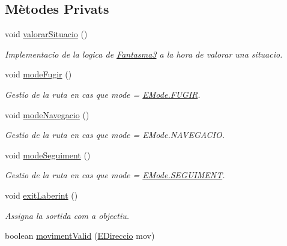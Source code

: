 \subsection*{Mètodes Privats}
\begin{DoxyCompactItemize}
\item 
void \hyperlink{classlogica_1_1_fantasma3_a69e326a7ea8fd47d3d8e4e3f8fd70412}{valorar\+Situacio} ()
\begin{DoxyCompactList}\small\item\em Implementacio de la logica de \hyperlink{classlogica_1_1_fantasma3}{Fantasma3} a la hora de valorar una situacio. \end{DoxyCompactList}\item 
void \hyperlink{classlogica_1_1_fantasma3_adc23af337e2803cf4a93a72a01d3686a}{mode\+Fugir} ()
\begin{DoxyCompactList}\small\item\em Gestio de la ruta en cas que mode = \hyperlink{enumlogica_1_1_fantasma3_1_1_e_mode_aacfca5adc0f5fa09c1776bc53234f341}{E\+Mode.\+F\+U\+G\+I\+R}. \end{DoxyCompactList}\item 
void \hyperlink{classlogica_1_1_fantasma3_a80230e04c68deb1a2f59b6d255846178}{mode\+Navegacio} ()
\begin{DoxyCompactList}\small\item\em Gestio de la ruta en cas que mode = E\+Mode.\+N\+A\+V\+E\+G\+A\+C\+I\+O. \end{DoxyCompactList}\item 
void \hyperlink{classlogica_1_1_fantasma3_a8f73d5761fb98ad7b353846e97ec2cb7}{mode\+Seguiment} ()
\begin{DoxyCompactList}\small\item\em Gestio de la ruta en cas que mode = \hyperlink{enumlogica_1_1_fantasma3_1_1_e_mode_a96323a795182c39b55457ff5b990bc32}{E\+Mode.\+S\+E\+G\+U\+I\+M\+E\+N\+T}. \end{DoxyCompactList}\item 
void \hyperlink{classlogica_1_1_fantasma3_aa6c40d16b8b8c48954c5394d97b9a5be}{exit\+Laberint} ()
\begin{DoxyCompactList}\small\item\em Assigna la sortida com a objectiu. \end{DoxyCompactList}\item 
boolean \hyperlink{classlogica_1_1_fantasma3_ab980aa309510eb888965a424743f38a7}{moviment\+Valid} (\hyperlink{enumlogica_1_1enumeracions_1_1_e_direccio}{E\+Direccio} mov)

\end{DoxyCompactItemize}
